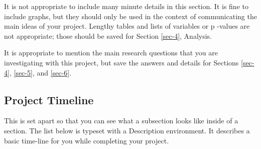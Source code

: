\documentclass[11pt]{article}
\begin{document}
It is not appropriate to include many minute details in this
section. It is fine to include graphs, but they should only be used in
the context of communicating the main ideas of your project. Lengthy
tables and lists of variables or p -values are not appropriate; those
should be saved for Section \ref{sec-4}, Analysis.

It is appropriate to mention the main research questions that you are
investigating with this project, but save the answers and details for
Sections \ref{sec-4}, \ref{sec-5}, and \ref{sec-6}.

\subsection[Project Timeline]{Project Timeline}
\label{sec-2-1}

This is set apart so that you can see what a subsection looks like
inside of a section. The list below is typeset with a Description
environment. It describes a basic time-line for you while completing
your project.
\end{document}

